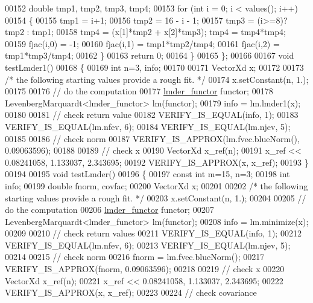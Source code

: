 \begin{DoxyCode}
00152         \textcolor{keywordtype}{double} tmp1, tmp2, tmp3, tmp4;
00153         \textcolor{keywordflow}{for} (\textcolor{keywordtype}{int} i = 0; i < values(); i++)
00154         \{
00155             tmp1 = i+1;
00156             tmp2 = 16 - i - 1;
00157             tmp3 = (i>=8)? tmp2 : tmp1;
00158             tmp4 = (x[1]*tmp2 + x[2]*tmp3); tmp4 = tmp4*tmp4;
00159             fjac(i,0) = -1;
00160             fjac(i,1) = tmp1*tmp2/tmp4;
00161             fjac(i,2) = tmp1*tmp3/tmp4;
00162         \}
00163         \textcolor{keywordflow}{return} 0;
00164     \}
00165 \};
00166 
00167 \textcolor{keywordtype}{void} testLmder1()
00168 \{
00169   \textcolor{keywordtype}{int} n=3, info;
00170 
00171   VectorXd x;
00172 
00173   \textcolor{comment}{/* the following starting values provide a rough fit. */}
00174   x.setConstant(n, 1.);
00175 
00176   \textcolor{comment}{// do the computation}
00177   \hyperlink{structlmder__functor}{lmder\_functor} functor;
00178   LevenbergMarquardt<lmder\_functor> lm(functor);
00179   info = lm.lmder1(x);
00180 
00181   \textcolor{comment}{// check return value}
00182   VERIFY\_IS\_EQUAL(info, 1);
00183   VERIFY\_IS\_EQUAL(lm.nfev, 6);
00184   VERIFY\_IS\_EQUAL(lm.njev, 5);
00185 
00186   \textcolor{comment}{// check norm}
00187   VERIFY\_IS\_APPROX(lm.fvec.blueNorm(), 0.09063596);
00188 
00189   \textcolor{comment}{// check x}
00190   VectorXd x\_ref(n);
00191   x\_ref << 0.08241058, 1.133037, 2.343695;
00192   VERIFY\_IS\_APPROX(x, x\_ref);
00193 \}
00194 
00195 \textcolor{keywordtype}{void} testLmder()
00196 \{
00197   \textcolor{keyword}{const} \textcolor{keywordtype}{int} m=15, n=3;
00198   \textcolor{keywordtype}{int} info;
00199   \textcolor{keywordtype}{double} fnorm, covfac;
00200   VectorXd x;
00201 
00202   \textcolor{comment}{/* the following starting values provide a rough fit. */}
00203   x.setConstant(n, 1.);
00204 
00205   \textcolor{comment}{// do the computation}
00206   \hyperlink{structlmder__functor}{lmder\_functor} functor;
00207   LevenbergMarquardt<lmder\_functor> lm(functor);
00208   info = lm.minimize(x);
00209 
00210   \textcolor{comment}{// check return values}
00211   VERIFY\_IS\_EQUAL(info, 1);
00212   VERIFY\_IS\_EQUAL(lm.nfev, 6);
00213   VERIFY\_IS\_EQUAL(lm.njev, 5);
00214 
00215   \textcolor{comment}{// check norm}
00216   fnorm = lm.fvec.blueNorm();
00217   VERIFY\_IS\_APPROX(fnorm, 0.09063596);
00218 
00219   \textcolor{comment}{// check x}
00220   VectorXd x\_ref(n);
00221   x\_ref << 0.08241058, 1.133037, 2.343695;
00222   VERIFY\_IS\_APPROX(x, x\_ref);
00223 
00224   \textcolor{comment}{// check covariance}

\end{DoxyCode}
